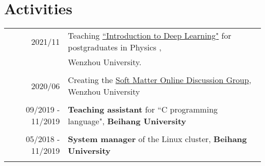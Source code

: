 \documentclass[a4paper,10pt]{article} %
\begin{document}
\section{Activities}
\begin{tabular}{r|l}	
	2021/11                        & Teaching \href{https://github.com/way2ml/forum/discussions/13}{``Introduction to Deep Learning"} for postgraduates in Physics ,\\ & Wenzhou University.\\
	\multicolumn{2}{c}{} \\	%
	 
	
	2020/06                        & Creating the \href{https://github.com/HuangJiaLian/SoftMatterDiscuss}{Soft Matter Online Discussion Group}, Wenzhou University\\
	\multicolumn{2}{c}{} \\	%
	
	09/2019 - 11/2019                     & \textbf{Teaching assistant }for  ``C programming language", \textbf{Beihang University} \\   	
	\multicolumn{2}{c}{} \\	%
	
	05/2018 - 11/2019                     & \textbf{System manager} of the Linux cluster,  \textbf{Beihang University}\\
	\multicolumn{2}{c}{} \\	%
	
\end{tabular}
\end{document}
